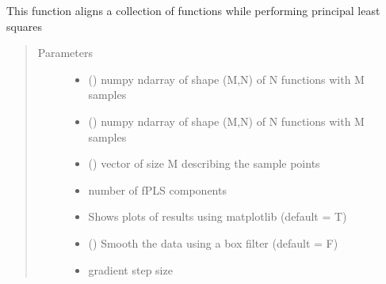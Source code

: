 \documentclass[letterpaper,10pt,english]{sphinxmanual}
\begin{document}
\begin{fulllineitems}
\label{\detokenize{time_warping:time_warping.align_fPLS}}
This function aligns a collection of functions while performing
principal least squares
\begin{quote}\begin{description}
\item[{Parameters}] \leavevmode\begin{itemize}
\item {} 
 () \textendash{} numpy ndarray of shape (M,N) of N functions with M samples

\item {} 
 () \textendash{} numpy ndarray of shape (M,N) of N functions with M samples

\item {} 
 () \textendash{} vector of size M describing the sample points

\item {} 
 \textendash{} number of fPLS components

\item {} 
 \textendash{} Shows plots of results using matplotlib (default = T)

\item {} 
 () \textendash{} Smooth the data using a box filter (default = F)

\item {} 
 \textendash{} gradient step size


\end{itemize}
\end{description}
\end{quote}
\end{fulllineitems}
\end{document}
